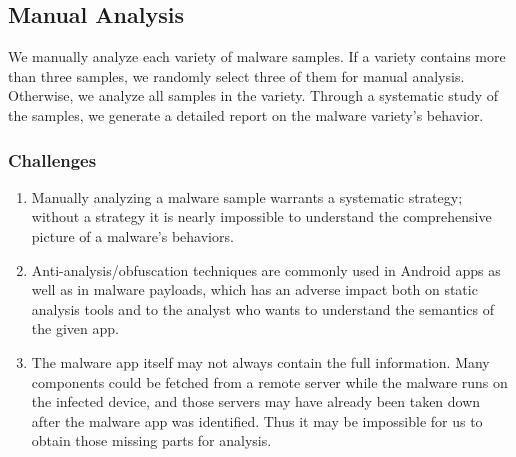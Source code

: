 
\vspace{-.1in}
\subsection{Manual Analysis}
\label{sec:manual}
We manually analyze each variety of malware samples. If a variety contains more than three samples, 
we randomly select three of them for manual analysis. Otherwise, we analyze all samples in 
the variety. Through a systematic study of the samples, we generate a detailed report 
on the malware variety's behavior.

\subsubsection{Challenges}
\vspace{-.1in}
\begin{enumerate}[label=\alph*)]
\item Manually analyzing a malware sample warrants a systematic strategy; 
without a strategy it is nearly impossible
 to understand the comprehensive picture of a malware's behaviors.
\item Anti-analysis/obfuscation techniques are commonly used in Android apps as well as in malware payloads,
which has an adverse impact both on static analysis tools and to the analyst who wants 
to understand the semantics of the given app. 
\item The malware app itself may not always contain the full information. Many components could be
fetched from a remote server while the malware runs on the infected device, and those servers
may have already been taken down after the malware app was identified. Thus it may be impossible for 
us to obtain those missing parts for analysis.
\end{enumerate}

